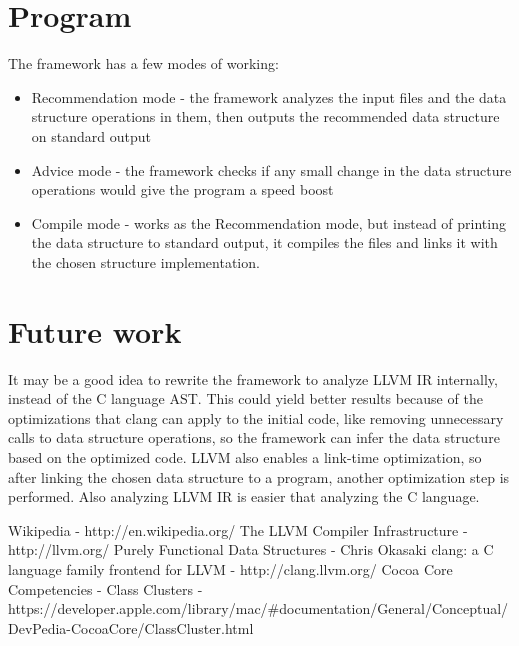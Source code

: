 \documentclass[a4paper,11pt]{article}
\begin{document}
\section{Program}

	The framework has a few modes of working:
	\begin{itemize}
		\item Recommendation mode - the framework analyzes the input files and the data structure operations in
			them, then outputs the recommended data structure on standard output
		\item Advice mode - the framework checks if any small change in the data structure operations would give
			the program a speed boost
		\item Compile mode - works as the Recommendation mode, but instead of printing the data structure to
			standard output, it compiles the files and links it with the chosen structure implementation.
	\end{itemize}

\section{Future work} \label{sec:future}
	It may be a good idea to rewrite the framework to analyze LLVM\cite{LLVM} IR internally, instead of the C
	language AST. This could yield better results because of the optimizations that clang\cite{Clang} can apply to
	the initial code, like removing unnecessary calls to data structure operations, so the framework can infer the
	data structure based on the optimized code. LLVM also enables a link-time optimization, so after linking the
	chosen data structure to a program, another optimization step is performed. Also analyzing LLVM IR is easier
	that analyzing the C language.

\begin{thebibliography}{9}
	 Wikipedia - http://en.wikipedia.org/
	 The LLVM Compiler Infrastructure - http://llvm.org/
	 Purely Functional Data Structures - Chris Okasaki
	 clang: a C language family frontend for LLVM - http://clang.llvm.org/
	 Cocoa Core Competencies - Class Clusters - \\
		https://developer.apple.com/library/mac/\#documentation/General/Conceptual/DevPedia-CocoaCore/ClassCluster.html
\end{thebibliography}
\end{document}
